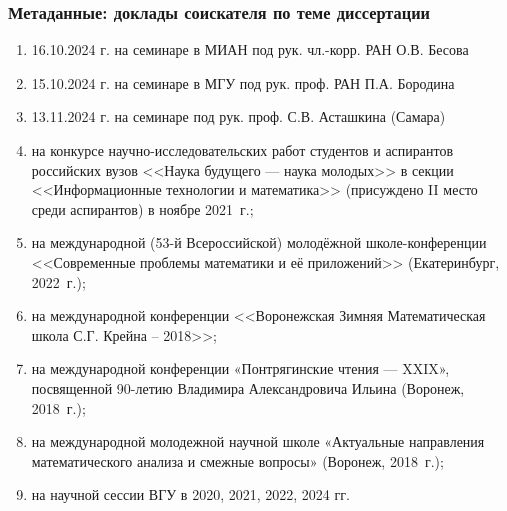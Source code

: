 \begin{frame}\frametitle{Метаданные: доклады соискателя по теме диссертации}
	\begin{enumerate}
		\item
			16.10.2024 г. на семинаре в МИАН под рук. чл.-корр. РАН О.В. Бесова
		\item
			15.10.2024 г. на семинаре в МГУ под рук. проф. РАН П.А. Бородина
		\item
			13.11.2024 г. на семинаре под рук. проф. С.В. Асташкина (Самара)
		\item
			на конкурсе научно-исследовательских работ студентов и аспирантов российских вузов
			<<Наука будущего --- наука молодых>> в секции <<Информационные технологии и математика>>
			(присуждено II место среди аспирантов) в ноябре 2021~г.;
		\item
			на международной (53-й Всероссийской) молодёжной школе-конференции
			<<Современные проблемы математики и её приложений>>
			(Екатеринбург, 2022~г.);
		\item
			на международной конференции <<Воронежская Зимняя Математическая школа С.Г. Крейна – 2018>>;
		\item
			на международной конференции «Понтрягинские чтения — XXIX», посвященной 90-летию Владимира Александровича Ильина (Воронеж, 2018~г.);
		\item
			на международной молодежной научной школе «Актуальные направления математического анализа и смежные вопросы» (Воронеж, 2018~г.);
		\item
			на научной сессии ВГУ в 2020, 2021, 2022, 2024 гг.

	\end{enumerate}
\end{frame}
